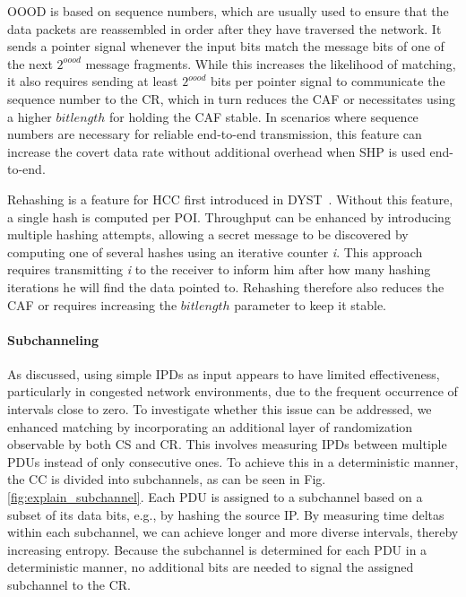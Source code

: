 \documentclass[journal]{IEEEtran}
\begin{document}
\ac{OOOD} is based on sequence numbers, which are usually used to ensure that the data packets are reassembled in order after they have traversed the network. It sends a pointer signal whenever the input bits match the message bits of one of the next $2^{oood}$ message fragments. While this increases the likelihood of matching, it also requires sending at least $2^{oood}$ bits per pointer signal to communicate the sequence number to the \ac{CR}, which in turn reduces the \ac{CAF} or necessitates using a higher $bitlength$ for holding the \ac{CAF} stable. In scenarios where sequence numbers are necessary for reliable end-to-end transmission, this feature can increase the covert data rate without additional overhead when \ac{SHP} is used end-to-end.

Rehashing is a feature for \ac{HCC} first introduced in \ac{DYST}~\cite{DYST22}. Without this feature, a single hash is computed per \ac{POI}. Throughput can be enhanced by introducing multiple hashing attempts, allowing a secret message to be discovered by computing one of several hashes using an iterative counter \textit{i}. This approach requires transmitting \textit{i} to the receiver to inform him after how many hashing iterations he will find the data pointed to. Rehashing therefore also reduces the \ac{CAF} or requires increasing the $bitlength$ parameter to keep it stable.

\paragraph{Subchanneling}
As discussed, using simple \ac{IPD}s as input appears to have limited effectiveness, particularly in congested network environments, due to the frequent occurrence of intervals close to zero. To investigate whether this issue can be addressed, we enhanced matching by incorporating an additional layer of randomization observable by both \ac{CS} and \ac{CR}. This involves measuring \ac{IPD}s between multiple \ac{PDU}s instead of only consecutive ones. To achieve this in a deterministic manner, the \ac{CC} is divided into subchannels, as can be seen in Fig. \ref{fig:explain_subchannel}. Each \ac{PDU} is assigned to a subchannel based on a subset of its data bits, e.g., by hashing the source \ac{IP}. By measuring time deltas within each subchannel, we can achieve longer and more diverse intervals, thereby increasing entropy. Because the subchannel is determined for each \ac{PDU} in a deterministic manner, no additional bits are needed to signal the assigned subchannel to the \ac{CR}.
\end{document}
